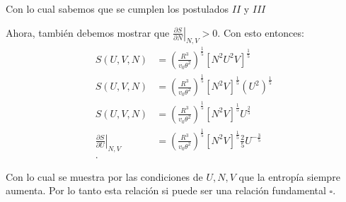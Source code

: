 \documentclass{report}
\begin{document}
Con lo cual sabemos que se cumplen los postulados $II$ y  $III$

Ahora, también debemos mostrar que $\left. \frac{\partial S}{\partial N}  \right|_{N, V} > 0 $. Con esto entonces:
  \begin{align*}
  S\left( U, V, N \right) &= \left( \frac{R^{3}}{v_0 \theta^2} \right)^{\frac{1}{5}} \left[ N^2 U^2 V \right]^{\frac{1}{5}} \\
  S\left( U, V, N \right) &= \left( \frac{R^{3}}{v_0 \theta^2} \right)^{\frac{1}{5}} \left[ N^2  V \right]^{\frac{1}{5}} \left( U^2 \right)^{\frac{1}{5}}  \\
  S\left( U, V, N \right) &= \left( \frac{R^{3}}{v_0 \theta^2} \right)^{\frac{1}{5}} \left[ N^2  V \right]^{\frac{1}{5}} U^{\frac{2}{5}}  \\
  \left. \frac{\partial S}{\partial U}  \right|_{N, V} &= \left( \frac{R^{3}}{v_0 \theta^2} \right)^{\frac{1}{5}} \left[ N^2  V \right]^{\frac{1}{5}} \frac{2}{5}U^{-\frac{3}{5}} \\
  .\end{align*}

  Con lo cual se muestra por las condiciones de $U, N, V$ que la entropía siempre aumenta. Por lo tanto esta relación si puede ser una relación fundamental $\square$.
\end{document}

